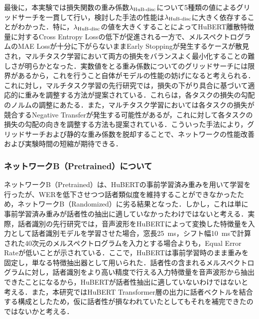 最後に，本実験では損失関数の重み係数$\lambda_{\text{HuB-disc}}$について5種類の値によるグリッドサーチを一貫して行い，検討した手法の性能は$\lambda_{\text{HuB-disc}}$に大きく依存することがわかった．特に，$\lambda_{\text{HuB-disc}}$の値を大きくすることによってHuBERT離散特徴量に対するCross Entropy Lossの低下が促進される一方で、メルスペクトログラムのMAE Lossが十分に下がらないままEarly Stoppingが発生するケースが散見され，マルチタスク学習において両方の損失をバランスよく最小化することの難しさが明らかとなった．実数値をとる重み係数についてのグリッドサーチには限界があるから，これを行うこと自体がモデルの性能の妨げになると考えられる．これに対し，マルチタスク学習の先行研究では，損失の下がり具合に基づいて適応的に重みを調整する方法\cite{chen2018gradnorm,liu2019end}が提案されている．これらは，各タスクの損失の勾配のノルムの調整にあたる．また，マルチタスク学習においては各タスクの損失が競合するNegative Transfer\cite{crawshaw2020multi}が発生する可能性があるが，これに対して各タスクの損失の勾配の向きを調整する方法\cite{yu2020gradient}も提案されている．こういった手法により，グリッドサーチおよび静的な重み係数を脱却することで、ネットワークの性能改善および実験時間の短縮が期待できる．

\subsubsection{ネットワークB（Pretrained）について}
ネットワークB（Pretrained）は、HuBERTの事前学習済み重みを用いて学習を行ったが、WERを低下させつつ話者類似度を維持することができなかったため，ネットワークB（Randomized）に劣る結果となった．しかし，これは単に事前学習済み重みが話者性の抽出に適していなかったわけではないと考える．実際，話者識別の先行研究\cite{chen2022large}では，音声波形をHuBERTによって変換した特徴量を入力として話者識別モデルを学習させた場合，窓長\SI{25}{\ms}，シフト幅\SI{10}{\ms}で計算された40次元のメルスペクトログラムを入力とする場合よりも，Equal Error Rateが低いことが示されている．ここで，HuBERTは事前学習時のまま重みを固定し，単なる特徴抽出器として用いられた．話者性の含まれるメルスペクトログラムに対し，話者識別をより高い精度で行える入力特徴量を音声波形から抽出できたことになるから，HuBERTが話者性抽出に適していないわけではないと考える．また，本研究ではHuBERT Transformer層の出力に話者ベクトルを結合する構成としたため，仮に話者性が損なわれていたとしてもそれを補完できたのではないかと考える．

